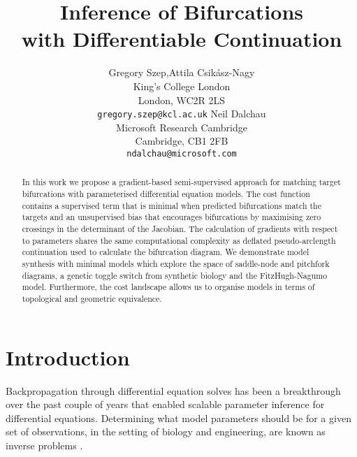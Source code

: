 

\title{Inference of Bifurcations\\with Differentiable Continuation}
\author{
        Gregory Szep,\quad Attila Csik\'asz-Nagy\\King's College London\\London, WC2R 2LS\\
        \texttt{gregory.szep@kcl.ac.uk}
    \And
        Neil Dalchau\\Microsoft Research Cambridge\\Cambridge, CB1 2FB\\
        \texttt{ndalchau@microsoft.com}
}



\maketitle

\begin{abstract}
    In this work we propose a gradient-based semi-supervised approach for matching target bifurcations with parameterised differential equation models. The cost function contains a supervised term that is minimal when predicted bifurcations match the targets and an unsupervised bias that encourages bifurcations by maximising zero crossings in the determinant of the Jacobian. The calculation of gradients with respect to parameters shares the same computational complexity as deflated pseudo-arclength continuation used to calculate the bifurcation diagram. We demonstrate model synthesis with minimal models which explore the space of saddle-node and pitchfork diagrams, a genetic toggle switch from synthetic biology and the FitzHugh-Nagumo model. Furthermore, the cost landscape allows us to  organise models in terms of topological and geometric equivalence.
\end{abstract}

\section{Introduction}

Backpropagation through differential equation solves has been a breakthrough over the past couple of years \cite{Chen2018NeuralEquations,Rackauckas2019DiffEqFlux.jl-AEquations} that enabled scalable parameter inference for differential equations. Determining what model parameters should be for a given set of observations, in the setting of biology and engineering, are known as inverse problems \cite{Abdulla2009InverseBiology}.

